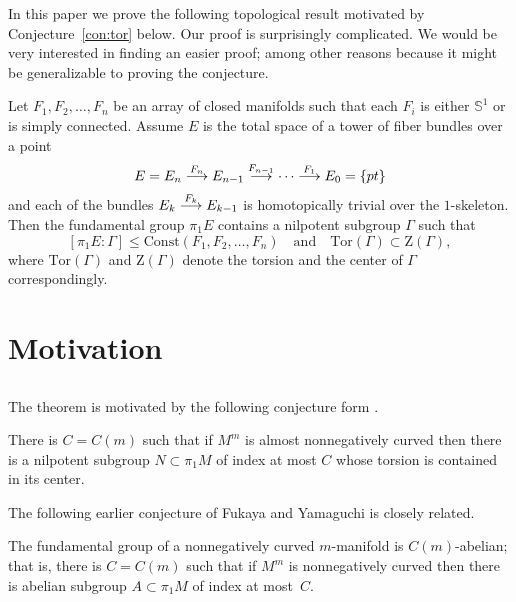 \documentclass{amsart}
\begin{document}
In this paper we prove the following topological result  motivated by Conjecture~\ref{con:tor} below.
Our proof  is surprisingly complicated.
We would be very interested in finding an easier proof;
among other reasons because it might be generalizable to proving the conjecture.

\begin{thm}\label{thm:smooth}
Let $F_1,F_2,\dots,F_n$ be an array of closed manifolds 
such that each $F_i$ is either $\mathbb{S}^{1}$ or is simply connected. 
Assume $E$ is the total space of a tower of fiber bundles over a point
$$E=E_n\buildrel {F_n}\over \longrightarrow E_{n-1}\buildrel {F_{n-1}}\over\longrightarrow\dots\buildrel {F_1}\over\longrightarrow E_0=\{pt\}$$
and each of the bundles $E_k\buildrel {F_k}\over \longrightarrow E_{k-1}$ is homotopically trivial over the $1$-skeleton. 
Then the fundamental group $\pi_1E$ contains a nilpotent subgroup $\Gamma$ such that
$$[\pi_1E:\Gamma]\le \mathrm{Const}(F_1,F_2,\dots,F_n)\quad\text{and}\quad\mathrm{Tor}(\Gamma)\subset \mathrm{Z}(\Gamma),$$
where $\mathrm{Tor}(\Gamma)$ and $\mathrm{Z}(\Gamma)$ denote the torsion and the center of $\Gamma$ correspondingly.
\end{thm}

\section{Motivation}

\subsection{} The theorem is motivated by the following conjecture form \cite{KPT}.

\begin{mconj}\label{con:tor}
There is $C=C(m)$ such that if $M^m$ is almost nonnegatively curved then there is a nilpotent subgroup $N\subset \pi_1M$ of index  at most $C$ whose torsion is contained in its center.
\end{mconj}

The following earlier conjecture of Fukaya and Yamaguchi \cite{FY} is closely related.

\begin{conj}\label{con:c-ab}
The fundamental group of a nonnegatively curved  $m$-manifold is $C(m)$-abelian;
that is, there is $C=C(m)$ such that if $M^m$ is nonnegatively curved then there is abelian subgroup $A\subset \pi_1M$ of index  at most~$C$.
\end{conj}
\end{document}
